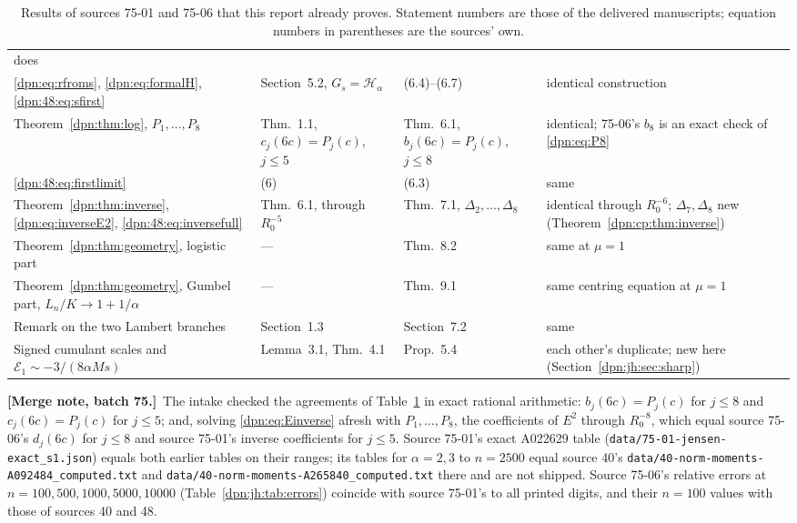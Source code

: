 \documentclass[11pt]{article}
\numberwithin{equation}{section}
\theoremstyle{definition}\newtheorem{definition}[theorem]{Definition}
\theoremstyle{remark}\newtheorem{remark}[theorem]{Remark}
\newcommand{\asym}{\mathscr H_{\alpha}}
\newcommand{\file}[1]{\nolinkurl{#1}}
\newcommand{\mergenoteb}[1]{\par\smallskip\noindent\textbf{[Merge note, batch 75.]}\ #1\par\smallskip}
\begin{document}
\begin{table}[!htbp]
\begin{tabular}{>{\raggedright\arraybackslash}p{3.5cm}>{\raggedright\arraybackslash}p{3.0cm}>{\raggedright\arraybackslash}p{3.0cm}>{\raggedright\arraybackslash}p{3.8cm}}
 48 does\\
\eqref{dpn:eq:rfroms}, \eqref{dpn:eq:formalH}, \eqref{dpn:48:eq:sfirst} &
 Section~5.2, $G_s=\asym$ & (6.4)--(6.7) & identical construction\\
Theorem~\ref{dpn:thm:log}, $P_1,\dots,P_8$ & Thm.~1.1, $c_j(6c)=P_j(c)$,
 $j\le5$ & Thm.~6.1, $b_j(6c)=P_j(c)$, $j\le8$ & identical; 75-06's $b_8$ is
 an exact check of \eqref{dpn:eq:P8}\\
\eqref{dpn:48:eq:firstlimit} & (6) & (6.3) & same\\
Theorem~\ref{dpn:thm:inverse}, \eqref{dpn:eq:inverseE2},
 \eqref{dpn:48:eq:inversefull} & Thm.~6.1, through $R_0^{-5}$ &
 Thm.~7.1, $\Delta_2,\dots,\Delta_8$ & identical through $R_0^{-6}$;
 $\Delta_7,\Delta_8$ new (Theorem~\ref{dpn:cp:thm:inverse})\\
Theorem~\ref{dpn:thm:geometry}, logistic part & --- & Thm.~8.2 &
 same at $\mu=1$\\
Theorem~\ref{dpn:thm:geometry}, Gumbel part, $L_n/K\to1+1/\alpha$ & --- &
 Thm.~9.1 & same centring equation at $\mu=1$\\
Remark on the two Lambert branches & Section~1.3 & Section~7.2 & same\\
Signed cumulant scales and $\mathcal E_1\sim-3/(8\alpha Ms)$ & Lemma~3.1,
 Thm.~4.1 & Prop.~5.4 & each other's duplicate; new here
 (Section~\ref{dpn:jh:sec:sharp})\\
\bottomrule
\end{tabular}
\caption{Results of sources 75-01 and 75-06 that this report already proves.
Statement numbers are those of the delivered manuscripts; equation numbers
in parentheses are the sources' own.}\label{dpn:tab:b75dup}
\end{table}

\mergenoteb{The intake checked the agreements of Table~\ref{dpn:tab:b75dup}
in exact rational arithmetic: $b_j(6c)=P_j(c)$ for $j\le8$ and
$c_j(6c)=P_j(c)$ for $j\le5$; and, solving \eqref{dpn:eq:Einverse} afresh with
$P_1,\dots,P_8$, the coefficients of $E^2$ through $R_0^{-8}$, which equal
source 75-06's $d_j(6c)$ for $j\le8$ and source 75-01's inverse coefficients
for $j\le5$.  Source 75-01's exact A022629 table
(\file{data/75-01-jensen-exact_s1.json}) equals both earlier tables on their
ranges; its tables for $\alpha=2,3$ to $n=2500$ equal source 40's
\file{data/40-norm-moments-A092484_computed.txt} and
\file{data/40-norm-moments-A265840_computed.txt} there and are not shipped.
Source 75-06's relative errors at $n=100,500,1000,5000,10000$
(Table~\ref{dpn:jh:tab:errors}) coincide with source 75-01's to all printed
digits, and their $n=100$ values with those of sources 40 and 48.}
\end{document}
